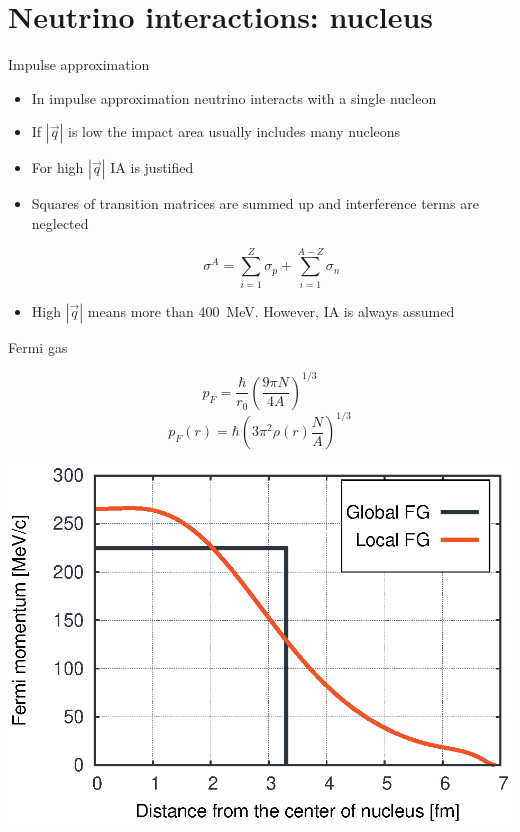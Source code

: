 \section[toc=$\nu A$ interactions]{Neutrino interactions: nucleus}

\begin{slide}{Impulse approximation}
\null\vfill

  \twocolumn
  {
    \begin{itemize}
      \item In impulse approximation neutrino interacts with a single nucleon
      \item If $|\vec q|$ is low the impact area usually includes many nucleons
      \item For high $|\vec q|$ IA is justified
    \end{itemize}    
  }
  {
    \centering\scalebox{0.5}{}
  }
  
  \begin{itemize}
    \item Squares of transition matrices are summed up and interference terms are neglected
  
    $$\sigma^A = \sum\limits_{i = 1}^Z \sigma_p + \sum\limits_{i = 1}^{A - Z}\sigma_n$$
    
    \item High $|\vec q|$ means more than 400~MeV. However, IA is always assumed
  \end{itemize}
  
\vfill\null
\end{slide}

\begin{slide}{Fermi gas}
\null\vfill

  \twocolumn
  {
  }
  {
    \vspace*{-10pt}
    
  }
  \twocolumn
  {
    $$p_F = \frac{\hbar}{r_0}\left(\frac{9\pi N}{4A}\right)^{1/3}$$  
  }
  {
    $$p_F(r) = \hbar\left(3\pi^2\rho(r) \frac{N}{A}\right)^{1/3}$$  
  }
  
  \centering\includegraphics[width=0.5\columnwidth]{figures/fermigas.eps}
  
\vfill\null
\end{slide}

